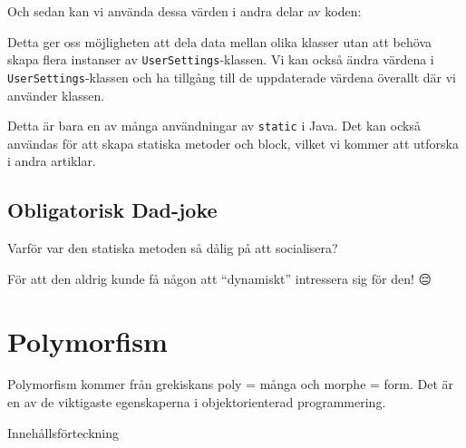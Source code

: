 Och sedan kan vi använda dessa värden i andra delar av koden:

\hypertarget{cb3}{}
\begin{Shaded}
\begin{Highlighting}[]
\OperatorTok{(} \OperatorTok{+}\OperatorTok{);}
\OperatorTok{(} \OperatorTok{+}\OperatorTok{);}
\OperatorTok{(} \OperatorTok{+}\OperatorTok{);}
\end{Highlighting}
\end{Shaded}

Detta ger oss möjligheten att dela data mellan olika klasser utan att
behöva skapa flera instanser av \texttt{UserSettings}-klassen. Vi kan
också ändra värdena i \texttt{UserSettings}-klassen och ha tillgång till
de uppdaterade värdena överallt där vi använder klassen.

Detta är bara en av många användningar av \texttt{static} i Java. Det
kan också användas för att skapa statiska metoder och block, vilket vi
kommer att utforska i andra artiklar.

\hypertarget{obligatorisk-dad-joke}{%
\subsection{Obligatorisk Dad-joke}\label{obligatorisk-dad-joke}}

Varför var den statiska metoden så dålig på att socialisera?

För att den aldrig kunde få någon att ``dynamiskt'' intressera sig för
den! 😔

\hypertarget{polymorfism}{%
\section{Polymorfism}\label{polymorfism}}

Polymorfism kommer från grekiskans poly = många och morphe = form. Det
är en av de viktigaste egenskaperna i objektorienterad programmering.

Innehållsförteckning

